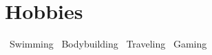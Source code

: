 \documentclass[letter,10pt]{article}
\begin{document}

\section*{Hobbies}
\noindent
\textbullet\ Swimming
\hfill
\textbullet\ Bodybuilding
\hfill
\textbullet\ Traveling
\hfill
\textbullet\ Gaming
\end{document}
